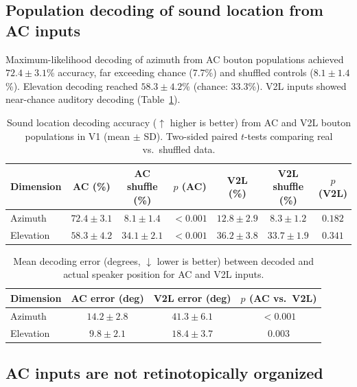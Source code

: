 \documentclass[11pt]{article}
\begin{document}
\subsection{Population decoding of sound location from AC inputs}

Maximum-likelihood decoding of azimuth from AC bouton populations achieved $72.4 \pm 3.1$\% accuracy, far exceeding chance (7.7\%) and shuffled controls ($8.1 \pm 1.4$\%). Elevation decoding reached $58.3 \pm 4.2$\% (chance: 33.3\%). V2L inputs showed near-chance auditory decoding (Table~\ref{tab:decoding}).

\begin{table}[H]
\centering
\caption{Sound location decoding accuracy ($\uparrow$ higher is better) from AC and V2L bouton populations in V1 (mean $\pm$ SD). Two-sided paired $t$-tests comparing real vs.\ shuffled data.}
\label{tab:decoding}
\begin{tabular}{lcccccc}
\toprule
\textbf{Dimension} & \textbf{AC (\%)} & \textbf{AC shuffle (\%)} & \textbf{$p$ (AC)} & \textbf{V2L (\%)} & \textbf{V2L shuffle (\%)} & \textbf{$p$ (V2L)} \\
\midrule
Azimuth & $72.4 \pm 3.1$ & $8.1 \pm 1.4$ & $< 0.001$ & $12.8 \pm 2.9$ & $8.3 \pm 1.2$ & $0.182$ \\
Elevation & $58.3 \pm 4.2$ & $34.1 \pm 2.1$ & $< 0.001$ & $36.2 \pm 3.8$ & $33.7 \pm 1.9$ & $0.341$ \\
\bottomrule
\end{tabular}
\end{table}

\begin{table}[H]
\centering
\caption{Mean decoding error (degrees, $\downarrow$ lower is better) between decoded and actual speaker position for AC and V2L inputs.}
\label{tab:decoding_error}
\begin{tabular}{lccc}
\toprule
\textbf{Dimension} & \textbf{AC error (deg)} & \textbf{V2L error (deg)} & \textbf{$p$ (AC vs.\ V2L)} \\
\midrule
Azimuth & $14.2 \pm 2.8$ & $41.3 \pm 6.1$ & $< 0.001$ \\
Elevation & $9.8 \pm 2.1$ & $18.4 \pm 3.7$ & $0.003$ \\
\bottomrule
\end{tabular}
\end{table}

\subsection{AC inputs are not retinotopically organized}
\end{document}
